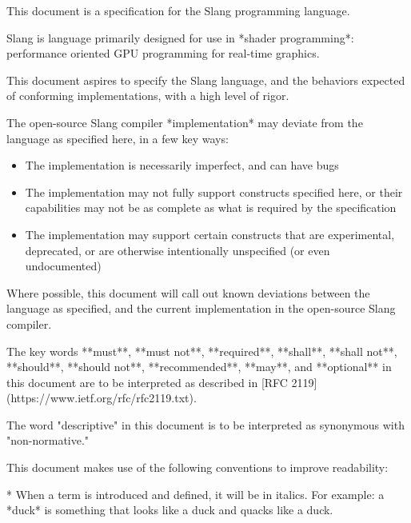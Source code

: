 

This document is a specification for the Slang programming language.

Slang is language primarily designed for use in *shader programming*: performance oriented GPU programming for real-time graphics.


This document aspires to specify the Slang language, and the behaviors expected of conforming implementations, with a high level of rigor.

The open-source Slang compiler *implementation* may deviate from the language as specified here, in a few key ways:

\begin{itemize}
    \item{The implementation is necessarily imperfect, and can have bugs}
    \item{The implementation may not fully support constructs specified here, or their capabilities may not be as complete as what is required by the specification}
    \item{The implementation may support certain constructs that are experimental, deprecated, or are otherwise intentionally unspecified (or even undocumented)}
\end{itemize}

Where possible, this document will call out known deviations between the language as specified, and the current implementation in the open-source Slang compiler.


The key words **must**, **must not**, **required**, **shall**, **shall not**, **should**, **should not**, **recommended**, **may**, and **optional** in this document are to be interpreted as described in [RFC 2119](https://www.ietf.org/rfc/rfc2119.txt).

The word "descriptive" in this document is to be interpreted as synonymous with "non-normative."


This document makes use of the following conventions to improve readability:

* When a term is introduced and defined, it will be in italics. For example: a *duck* is something that looks like a duck and quacks like a duck.

